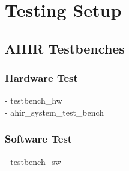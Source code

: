 \chapter{Testing Setup}

\section{AHIR Testbenches}

\subsection{Hardware Test}

- testbench\_hw \\
- ahir\_system\_test\_bench \\

\subsection{Software Test}

- testbench\_sw \\

